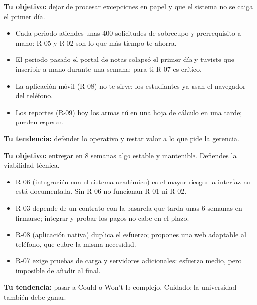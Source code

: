 \documentclass[11pt]{article}
\begin{document}
\begin{tarjeta}[title={ROL 2 \,$\cdot$\, USUARIO OPERATIVO (secretaria académica)}]
	\textbf{Tu objetivo:} dejar de procesar excepciones en papel y que el sistema no se caiga el primer día.
	\begin{itemize}[leftmargin=14pt,itemsep=1pt,topsep=2pt]
		\item Cada periodo atiendes unas 400 solicitudes de sobrecupo y prerrequisito a mano: R-05 y R-02 son lo que más tiempo te ahorra.
		\item El periodo pasado el portal de notas colapsó el primer día y tuviste que inscribir a mano durante una semana: para ti R-07 es crítico.
		\item La aplicación móvil (R-08) no te sirve: los estudiantes ya usan el navegador del teléfono.
		\item Los reportes (R-09) hoy los armas tú en una hoja de cálculo en una tarde; pueden esperar.
	\end{itemize}
	\textbf{Tu tendencia:} defender lo operativo y restar valor a lo que pide la gerencia.
\end{tarjeta}

\begin{tarjeta}[title={ROL 3 \,$\cdot$\, DESARROLLADOR (líder técnico)}]
	\textbf{Tu objetivo:} entregar en 8 semanas algo estable y mantenible. Defiendes la viabilidad técnica.
	\begin{itemize}[leftmargin=14pt,itemsep=1pt,topsep=2pt]
		\item R-06 (integración con el sistema académico) es el mayor riesgo: la interfaz no está documentada. Sin R-06 no funcionan R-01 ni R-02.
		\item R-03 depende de un contrato con la pasarela que tarda unas 6 semanas en firmarse; integrar y probar los pagos no cabe en el plazo.
		\item R-08 (aplicación nativa) duplica el esfuerzo; propones una web adaptable al teléfono, que cubre la misma necesidad.
		\item R-07 exige pruebas de carga y servidores adicionales: esfuerzo medio, pero imposible de añadir al final.
	\end{itemize}
	\textbf{Tu tendencia:} pasar a Could o Won't lo complejo. Cuidado: la universidad también debe ganar.
\end{tarjeta}
\end{document}
